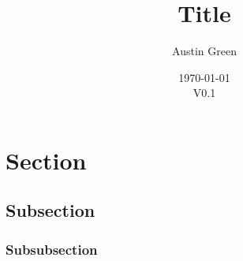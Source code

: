 \documentclass[10pt]{article}
\title{Title}
\author{Austin Green}
\date{\today\\V0.1}
\begin{document}
    \begin{titlepage}
    \maketitle
    \thispagestyle{empty}
    \end{titlepage}
	
	\tableofcontents
	\newpage

    \begin{comment}
	\section{TODOs}
		\begin{itemize}
            \item TODO
		\end{itemize}
	\section{Version Control}
		\begin{itemize}
			\item V0.1 - 
		\end{itemize}
    \end{comment}

	\section{Section}
        \subsection{Subsection}
            \subsubsection{Subsubsection}
\end{document}
